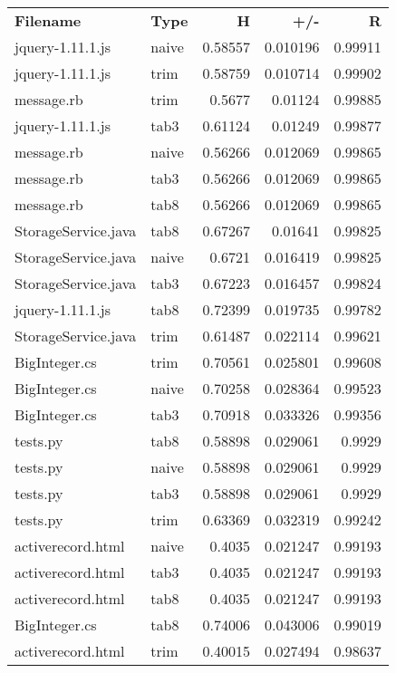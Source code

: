 \begin{longtable}{l l r r r}
\textbf{Filename} & \textbf{Type} & \textbf{H} & \textbf{+/-} & \textbf{R} \\
{jquery-1.11.1.js} & naive & 0.58557 & 0.010196 & 0.99911 \\
{jquery-1.11.1.js} & trim & 0.58759 & 0.010714 & 0.99902 \\
{message.rb} & trim & 0.5677 & 0.01124 & 0.99885 \\
{jquery-1.11.1.js} & tab3 & 0.61124 & 0.01249 & 0.99877 \\
{message.rb} & naive & 0.56266 & 0.012069 & 0.99865 \\
{message.rb} & tab3 & 0.56266 & 0.012069 & 0.99865 \\
{message.rb} & tab8 & 0.56266 & 0.012069 & 0.99865 \\
{StorageService.java} & tab8 & 0.67267 & 0.01641 & 0.99825 \\
{StorageService.java} & naive & 0.6721 & 0.016419 & 0.99825 \\
{StorageService.java} & tab3 & 0.67223 & 0.016457 & 0.99824 \\
{jquery-1.11.1.js} & tab8 & 0.72399 & 0.019735 & 0.99782 \\
{StorageService.java} & trim & 0.61487 & 0.022114 & 0.99621 \\
{BigInteger.cs} & trim & 0.70561 & 0.025801 & 0.99608 \\
{BigInteger.cs} & naive & 0.70258 & 0.028364 & 0.99523 \\
{BigInteger.cs} & tab3 & 0.70918 & 0.033326 & 0.99356 \\
{tests.py} & tab8 & 0.58898 & 0.029061 & 0.9929 \\
{tests.py} & naive & 0.58898 & 0.029061 & 0.9929 \\
{tests.py} & tab3 & 0.58898 & 0.029061 & 0.9929 \\
{tests.py} & trim & 0.63369 & 0.032319 & 0.99242 \\
{activerecord.html} & naive & 0.4035 & 0.021247 & 0.99193 \\
{activerecord.html} & tab3 & 0.4035 & 0.021247 & 0.99193 \\
{activerecord.html} & tab8 & 0.4035 & 0.021247 & 0.99193 \\
{BigInteger.cs} & tab8 & 0.74006 & 0.043006 & 0.99019 \\
{activerecord.html} & trim & 0.40015 & 0.027494 & 0.98637 \\
\end{longtable}
